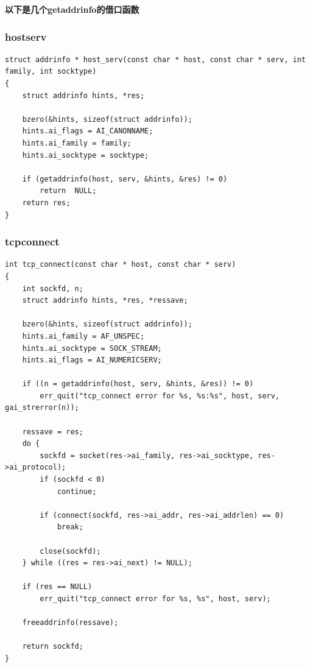 \textbf{以下是几个getaddrinfo的借口函数}
\subsubsection{host\li serv}
\begin{verbatim}
struct addrinfo * host_serv(const char * host, const char * serv, int family, int socktype)
{
    struct addrinfo hints, *res;

    bzero(&hints, sizeof(struct addrinfo));
    hints.ai_flags = AI_CANONNAME;
    hints.ai_family = family;
    hints.ai_socktype = socktype;

    if (getaddrinfo(host, serv, &hints, &res) != 0)
        return  NULL;
    return res;
}
\end{verbatim}

\newpage
\subsubsection{tcp\li connect}
\begin{verbatim}
int tcp_connect(const char * host, const char * serv)
{
    int sockfd, n;
    struct addrinfo hints, *res, *ressave;

    bzero(&hints, sizeof(struct addrinfo));
    hints.ai_family = AF_UNSPEC;
    hints.ai_socktype = SOCK_STREAM;
    hints.ai_flags = AI_NUMERICSERV;

    if ((n = getaddrinfo(host, serv, &hints, &res)) != 0)
        err_quit("tcp_connect error for %s, %s:%s", host, serv, gai_strerror(n));

    ressave = res;
    do {
        sockfd = socket(res->ai_family, res->ai_socktype, res->ai_protocol);
        if (sockfd < 0)
            continue;

        if (connect(sockfd, res->ai_addr, res->ai_addrlen) == 0)
            break;

        close(sockfd);
    } while ((res = res->ai_next) != NULL);

    if (res == NULL)
        err_quit("tcp_connect error for %s, %s", host, serv);

    freeaddrinfo(ressave);

    return sockfd;
}
\end{verbatim}
\newpage


